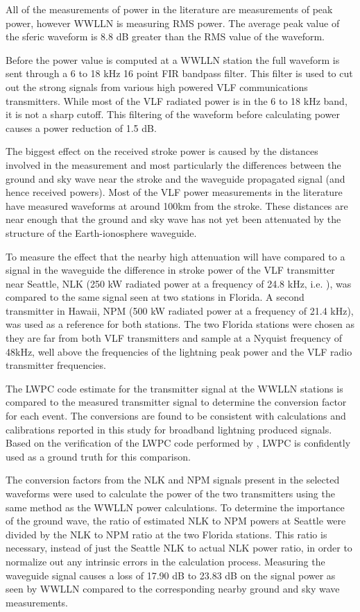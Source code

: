 All of the measurements of power in the literature are measurements of peak power, however WWLLN is measuring RMS power.
The average peak value of the sferic waveform is 8.8 dB greater than the RMS value of the waveform. 

Before the power value is computed at a WWLLN station the full waveform is sent through a 6 to 18 kHz 16 point FIR bandpass filter.
This filter is used to cut out the strong signals from various high powered VLF communications transmitters.
While most of the VLF radiated power is in the 6 to 18 kHz band, it is not a sharp cutoff.
This filtering of the waveform before calculating power causes a power reduction of 1.5 dB.

The biggest effect on the received stroke power is caused by the distances involved in the measurement and most particularly the differences between the ground and sky wave near the stroke and the waveguide propagated signal (and hence received powers).
Most of the VLF power measurements in the literature have measured waveforms at around 100km from the stroke.
These distances are near enough that the ground and sky wave has not yet been attenuated by the structure of the Earth-ionosphere waveguide.

To measure the effect that the nearby high attenuation will have compared to a signal in the waveguide the difference in stroke power of the VLF transmitter near Seattle, NLK (250 kW radiated power at a frequency of 24.8 kHz, i.e. \citet{Clilverd2009}), was compared to the same signal seen at two stations in Florida.
A second transmitter in Hawaii, NPM (500 kW radiated power at a frequency of 21.4 kHz), was used as a reference for both stations.
The two Florida stations were chosen as they are far from both VLF transmitters and sample at a Nyquist frequency of 48kHz, well above the frequencies of the lightning peak power and the VLF radio transmitter frequencies.

The LWPC code estimate for the transmitter signal at the WWLLN stations is compared to the measured transmitter signal to determine the conversion factor for each event.
The conversions are found to be consistent with calculations and calibrations reported in this study for broadband lightning produced signals.
Based on the verification of the LWPC code performed by \citet{Thomson2010}, LWPC is confidently used as a ground truth for this comparison.

The conversion factors from the NLK and NPM signals present in the selected waveforms were used to calculate the power of the two transmitters using the same method as the WWLLN power calculations.
To determine the importance of the ground wave, the ratio of estimated NLK to NPM powers at Seattle were divided by the NLK to NPM ratio at the two Florida stations.
This ratio is necessary, instead of just the Seattle NLK to actual NLK power ratio, in order to normalize out any intrinsic errors in the calculation process.
Measuring the waveguide signal causes a loss of 17.90 dB to 23.83 dB on the signal power as seen by WWLLN compared to the corresponding nearby ground and sky wave measurements.

